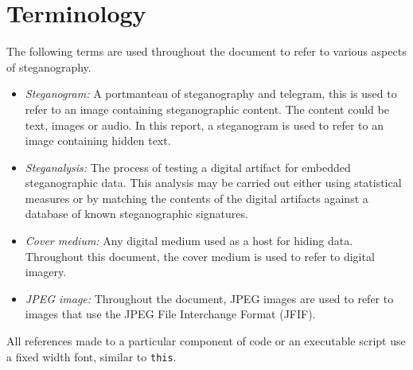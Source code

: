 \section{Terminology}
The following terms are used throughout the document to refer to various aspects of steganography. 
\begin{itemize}
\item{\emph{Steganogram:}} A portmanteau of steganography and telegram, this is used to refer to an image containing steganographic content. The content could be text, images or audio. In this report, a steganogram is used to refer to an image containing hidden text.
\item{\emph{Steganalysis:}} The process of testing a digital artifact for embedded steganographic data. This analysis may be carried out either using statistical measures or by matching the contents of the digital artifacts against a database of known steganographic signatures.
\item{\emph{Cover medium:}} Any digital medium used as a host for hiding data. Throughout this document, the cover medium is used to refer to digital imagery.
\item{\emph{JPEG image:}} Throughout the document, JPEG images are used to refer to images that use the JPEG File Interchange Format (JFIF).
\end{itemize}
 All references made to a particular component of code or an executable script use a fixed width font, similar to \texttt{this}.
